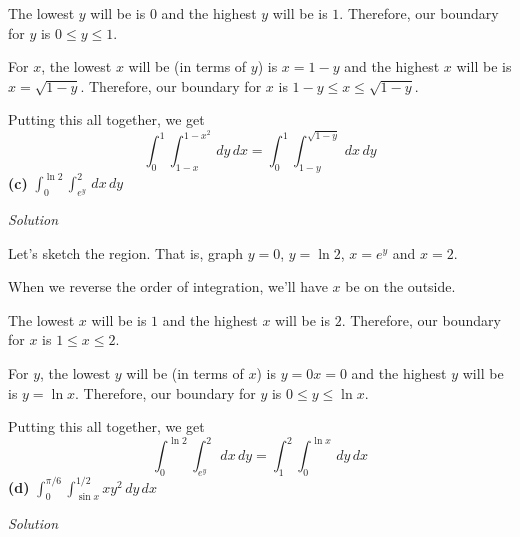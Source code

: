 \documentclass{article}
\newcommand{\Solution}{\textit{Solution}}
\begin{document}
The lowest $y$ will be is $0$ and the highest $y$ will be is $1$. Therefore, our boundary for $y$ is $0\leq y\leq 1$.

For $x$, the lowest $x$ will be (in terms of $y$) is $x=1-y$ and the highest $x$ will be is $x=\sqrt{1-y}$. Therefore, our boundary for $x$ is $1-y\leq x \leq \sqrt{1-y}$.

Putting this all together, we get
\begin{equation*}
    \boxed{\int_0^1\int_{1-x}^{1-x^2}\,dy\,dx=\int_0^1\int_{1-y}^{\sqrt{1-y}}\,dx\,dy}
\end{equation*}
\textbf{(c)} $\displaystyle \int_0^{\ln 2}\int_{e^y}^2\,dx\,dy$

\Solution

Let's sketch the region. That is, graph $y=0$, $y=\ln 2$, $x=e^y$ and $x=2$.
\begin{center}
\end{center}
When we reverse the order of integration, we'll have $x$ be on the outside.

The lowest $x$ will be is $1$ and the highest $x$ will be is $2$. Therefore, our boundary for $x$ is $1\leq x\leq 2$.

For $y$, the lowest $y$ will be (in terms of $x$) is $y=0x=0$ and the highest $y$ will be is $y=\ln x$. Therefore, our boundary for $y$ is $0\leq y \leq \ln x$.

Putting this all together, we get
\begin{equation*}
    \boxed{\int_0^{\ln 2}\int_{e^y}^2\,dx\,dy=\int_1^2\int_0^{\ln x}\,dy\,dx}
\end{equation*}
\textbf{(d)} $\displaystyle \int_0^{\pi / 6}\int_{\sin x}^{1/2}xy^2\,dy\,dx$

\Solution
\end{document}
